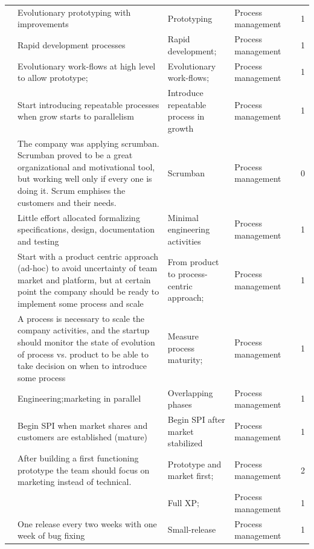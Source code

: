 \documentclass[final,5p,times,twocolumn]{elsarticle}
\begin{document}
\begin{center}
\begin{longtable}{|p{0.36in}|p{2.6in}|p{1.2in}|p{0.9in}|p{0.9in}|p{0.2in}|}
\cite{Deakins2005} & Evolutionary prototyping with improvements & Prototyping & Process management &       & 1 \\
\cite{Deakins2005} & Rapid development processes & Rapid development; & Process management &       & 1 \\
\cite{Sutton2000} & Evolutionary work-flows at high level to allow prototype; & Evolutionary work-flows; & Process management &       & 1 \\
\cite{Crowne2002} & Start introducing repeatable processes when grow starts to parallelism & Introduce repeatable process in growth & Process management &       & 1 \\
\cite{Kuvinka2011} & The company was applying scrumban. Scrumban proved to be a great organizational and motivational tool, but working well only if every one is doing it. Scrum emphises the customers and their needs. & Scrumban & Process management &       & 0 \\
\cite{Camel1994a} & Little effort allocated formalizing specifications, design, documentation and testing & Minimal engineering activities & Process management &       & 1 \\
\cite{Heitlager2007} & Start with a product centric approach (ad-hoc) to avoid uncertainty of team market and platform, but at certain point the company should be ready to implement some process and scale & From product to process-centric approach; & Process management &       & 1 \\
\cite{Heitlager2007} & A process is necessary to scale the company activities, and the startup should monitor the state of evolution of process vs. product to be able to take decision on when to introduce some process & Measure process maturity; & Process management &       & 1 \\
\cite{Camel1994a} & Engineering;marketing in parallel & Overlapping phases & Process management &       & 1 \\
\cite{Crowne2002} & Begin SPI when market shares and customers are established (mature) & Begin SPI after market stabilized & Process management &       & 1 \\
\cite{Kakati2003} & After building a first functioning prototype the team should focus on marketing instead of technical. & Prototype and market first; & Process management &       & 2 \\
\cite{Silva2005} &       & Full XP; & Process management &       & 1 \\
\cite{Silva2005} & One release every two weeks with one week of bug fixing & Small-release & Process management &       & 1 \\

\end{longtable}
\end{center}
\end{document}

